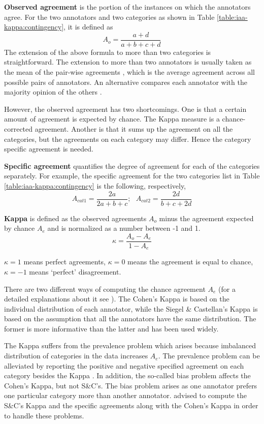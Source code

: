 {\bf Observed agreement} is the portion of the instances on which the 
annotators agree. For the two annotators and two categories as shown in
 Table \ref{table:iaa-kappa:contingency}, it is defined as
\begin{equation}
A_{o} = \frac{a+d}{a+b+c+d}
\end{equation}
The extension of the above formula to more than two categories is 
straightforward. The extension to more than two annotators is usually taken 
as the mean of the pair-wise agreements \cite{Fleiss75}, which is the average agreement 
across all possible pairs of annotators. 
An alternative compares each annotator with the majority opinion of the others 
\cite{Fleiss75}.

However, the observed agreement has two shortcomings. One is that a certain 
amount of agreement is expected by chance. The Kappa measure is a chance-corrected 
agreement. Another is that it sums up the agreement on all the categories, but 
the agreements on each category may differ. Hence the category specific agreement 
is needed.

{\bf Specific agreement} quantifies the degree of agreement for each of the categories 
separately. For example, the specific agreement for the two categories list in 
Table \ref{table:iaa-kappa:contingency} is the following, respectively,
\begin{equation}
A_{cat1} = \frac{2a}{2a+b+c}; \ \ \
A_{cat2} = \frac{2d}{b+c+2d}
\end{equation}

{\bf Kappa} is defined as the observed agreements $A_{o}$ minus the agreement 
expected by chance $A_{e}$ and is normalized as a number between -1 and 1.
\begin{equation}
\kappa =\frac{A_{o}-A_{e}}{1-A_{e}}
\end{equation}

$\kappa=1$ means perfect agreements, $\kappa=0$ means the agreement is equal to 
chance, $\kappa=-1$ means `perfect' disagreement.

There are two different ways of computing the chance agreement $A_{e}$
(for a detailed explanations about it see
\cite{Eugenio04}). The Cohen's Kappa is based on the individual distribution of 
each annotator, while the Siegel \& Castellan's Kappa is based on the assumption that all 
the annotators have the same distribution. The former is more informative than the 
latter and has been used widely. 

The Kappa suffers from the prevalence problem which arises because imbalanced 
distribution of categories in the data increases $A_{e}$. The prevalence problem can be 
alleviated by reporting the positive and negative specified  agreement on each category 
besides the Kappa \cite{ Hripcsak02, Eugenio04}. In addition, the so-called bias 
problem affects the Cohen's Kappa, but not S\&C's. The bias problem arises as one 
annotator prefers one particular category more than another annotator.
\cite{ Eugenio04} advised to compute the S\&C's Kappa and the specific agreements along
with the Cohen's Kappa in order to handle these problems.

